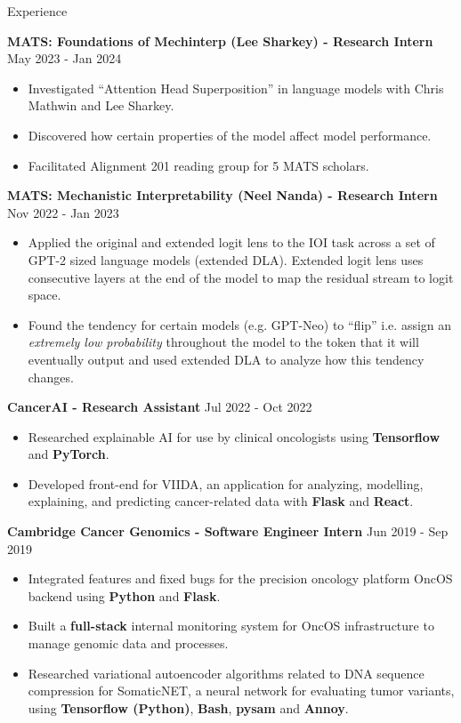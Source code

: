 \documentclass[hidelinks]{resume} %
\begin{document}
\begin{rSection}{Experience}

\textbf{MATS: Foundations of Mechinterp (Lee Sharkey) - Research Intern}
\hfill {May 2023 - Jan 2024}
\begin{itemize}
    \item Investigated ``Attention Head Superposition'' in language models with Chris Mathwin and Lee Sharkey.
    \item Discovered how certain properties of the model affect model performance. 
    \item Facilitated Alignment 201 reading group for 5 MATS scholars.
\end{itemize}

\textbf{MATS: Mechanistic Interpretability (Neel Nanda) - Research Intern}
\hfill {Nov 2022 - Jan 2023}
\begin{itemize}
    \item Applied the original and extended logit lens to the IOI task across a set of GPT-2 sized language models (extended DLA). Extended logit lens uses consecutive layers at the end of the model to map the residual stream to logit space.
    \item Found the tendency for certain models (e.g. GPT-Neo) to ``flip'' i.e. assign an \textit{extremely low probability} throughout the model to the token that it will eventually output and used extended DLA to analyze how this tendency changes.
\end{itemize}

\textbf{CancerAI - Research Assistant}
\hfill {Jul 2022 - Oct 2022}
\begin{itemize}
    \item Researched explainable AI for use by clinical oncologists using \textbf{Tensorflow} and \textbf{PyTorch}.
    \item Developed front-end for VIIDA, an application for analyzing, modelling, explaining, and predicting cancer-related data with \textbf{Flask} and \textbf{React}.
\end{itemize}

\textbf{Cambridge Cancer Genomics - Software Engineer Intern}
\hfill {Jun 2019 - Sep 2019}
\begin{itemize}
    \item Integrated features and fixed bugs for the precision oncology platform OncOS backend using \textbf{Python} and \textbf{Flask}.
    \item Built a \textbf{full-stack} internal monitoring system for OncOS infrastructure to manage genomic data and processes.
    \item Researched variational autoencoder algorithms related to DNA sequence compression for SomaticNET, a neural network for evaluating tumor variants, using \textbf{Tensorflow (Python)}, \textbf{Bash}, \textbf{pysam} and \textbf{Annoy}.
\end{itemize}

\end{rSection} 
\end{document}
